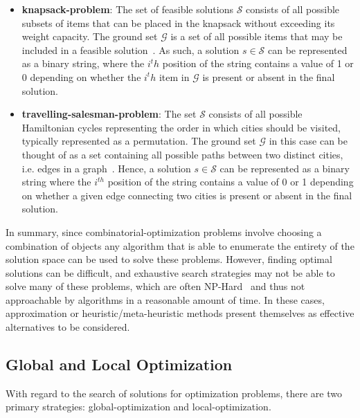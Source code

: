 \begin{itemize}
    \item \textbf{\acrlong{knapsack-problem}}: The set of feasible
          solutions $\mathcal{S}$ consists of all possible subsets of items that can
          be placed in the knapsack without exceeding its weight capacity. The ground
          set $\mathcal{G}$ is a set of all possible items that may be included in a
          feasible solution~\cite{festa2014brief}. As such, a solution $s \in
              \mathcal{S}$ can be represented as a binary string, where the $i^th$
          position of the string contains a value of 1 or 0 depending on whether the
          $i^th$ item in $\mathcal{G}$ is present or absent in the final solution.

    \item \textbf{\acrlong{travelling-salesman-problem}}: The set
          $\mathcal{S}$ consists of all possible Hamiltonian cycles representing the
          order in which cities should be visited, typically represented as a
          permutation. The ground set $\mathcal{G}$ in this case can be thought of as
          a set containing all possible paths between two distinct cities, i.e. edges
          in a graph~\cite{marti2013multistart,festa2014brief}. Hence, a solution $s
              \in \mathcal{S}$ can be represented as a binary string where the $i^{th}$
          position of the string contains a value of 0 or 1 depending on whether a
          given edge connecting two cities is present or absent in the final solution.
\end{itemize}

In summary, since \acrshort{combinatorial-optimization} problems involve
choosing a combination of objects any algorithm that is able to enumerate the
entirety of the solution space can be used to solve these problems. However, finding optimal
solutions can be difficult, and exhaustive search strategies may not be able to
solve many of these problems, which are often
NP-Hard~\cite{yu2010combinatorial,festa2014brief} and thus not approachable by
algorithms in a reasonable amount of time. In these cases, approximation or
heuristic/meta-heuristic methods present themselves as effective alternatives to be considered.

\subsection{Global and Local Optimization}

With regard to the search of solutions for optimization problems, there are two
primary strategies: \acrfull{global-optimization} and
\acrfull{local-optimization}.

